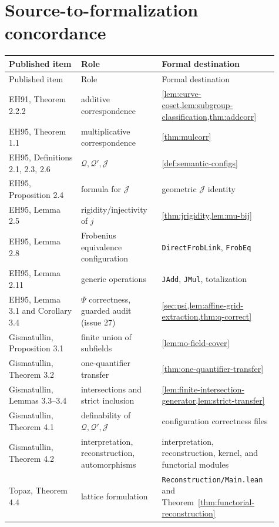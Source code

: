 \documentclass[11pt,oneside]{article}
\theoremstyle{definition}
\theoremstyle{remark}
\newcommand{\Qrel}{\mathcal{Q}}
\newcommand{\Qprel}{\mathcal{Q}'}
\newcommand{\Jrel}{\mathcal{J}}
\newcommand{\lean}[1]{\nolinkurl{#1}}
\begin{document}
\section{Source-to-formalization concordance}

\begin{longtable}{p{0.25\linewidth}p{0.29\linewidth}p{0.37\linewidth}}
\toprule
Published item & Role & Formal destination\\
\midrule
\endfirsthead
\toprule
Published item & Role & Formal destination\\
\midrule
\endhead
EH91, Theorem 2.2.2 & additive correspondence &
\cref{lem:curve-coset,lem:subgroup-classification,thm:addcorr}\\
EH95, Theorem 1.1 & multiplicative correspondence &
\cref{thm:mulcorr}\\
EH95, Definitions 2.1, 2.3, 2.6 & $\Qrel,\Qprel,\Jrel$ &
\cref{def:semantic-configs}\\
EH95, Proposition 2.4 & formula for $\Jrel$ &
geometric $\Jrel$ identity\\
EH95, Lemma 2.5 & rigidity/injectivity of $j$ &
\cref{thm:jrigidity,lem:mu-bij}\\
EH95, Lemma 2.8 & Frobenius equivalence configuration &
\lean{DirectFrobLink}, \lean{FrobEq}\\
EH95, Lemma 2.11 & generic operations &
\lean{JAdd}, \lean{JMul}, totalization\\
EH95, Lemma 3.1 and Corollary 3.4 & $\Psi$ correctness, guarded audit (issue 27) &
\cref{sec:psi,lem:affine-grid-extraction,thm:q-correct}\\
Gismatullin, Proposition 3.1 & finite union of subfields &
\cref{lem:no-field-cover}\\
Gismatullin, Theorem 3.2 & one-quantifier transfer &
\cref{thm:one-quantifier-transfer}\\
Gismatullin, Lemmas 3.3--3.4 & intersections and strict inclusion &
\cref{lem:finite-intersection-generator,lem:strict-transfer}\\
Gismatullin, Theorem 4.1 & definability of $\Qrel,\Qprel,\Jrel$ &
configuration correctness files\\
Gismatullin, Theorem 4.2 & interpretation, reconstruction, automorphisms &
interpretation, reconstruction, kernel, and functorial modules\\
Topaz, Theorem 4.4 & lattice formulation & \lean{Reconstruction/Main.lean} and
Theorem~\ref{thm:functorial-reconstruction}\\
\bottomrule
\end{longtable}
\end{document}
